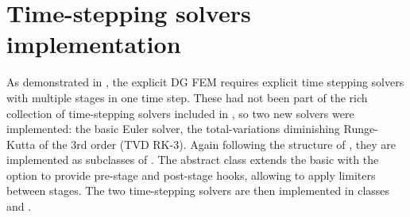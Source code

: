 \section{Time-stepping solvers implementation}
As demonstrated in , the explicit DG FEM requires explicit time stepping solvers
with multiple stages in one time step. These had not been part of the rich collection of time-stepping
solvers included in \sfepy{}, so two new solvers were implemented: the basic Euler solver, the total-variations
diminishing Runge-Kutta of the 3rd order (TVD RK-3). Again following the structure of \sfepy{}, they are
implemented as subclasses of . The abstract class
 extends the basic  with the option to provide
pre-stage and post-stage hooks, allowing to apply limiters between stages. The two time-stepping
solvers are then implemented in classes  and .
